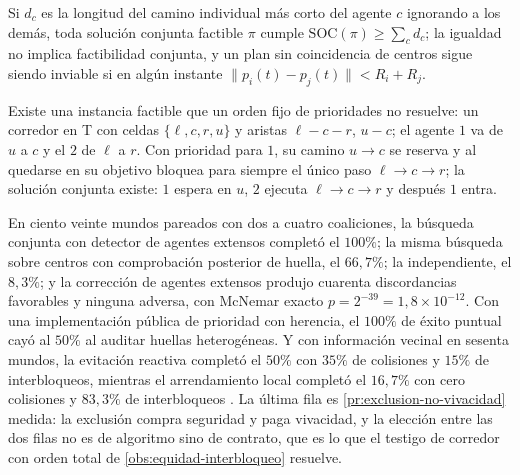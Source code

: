 \begin{lema}
\label{le:caminos-independientes}
Si $d_c$ es la longitud del camino individual más corto del agente $c$
ignorando a los demás, toda solución conjunta factible $\pi$ cumple
$\mathrm{SOC}(\pi)\ge\sum_cd_c$; la igualdad no implica factibilidad
conjunta, y un plan sin coincidencia de centros sigue siendo inviable si en
algún instante $\lVert p_i(t)-p_j(t)\rVert<R_i+R_j$.
\end{lema}

\begin{proposicion}
\label{pr:prioridad-incompleta}
Existe una instancia factible que un orden fijo de prioridades no resuelve:
un corredor en T con celdas $\{\ell,c,r,u\}$ y aristas $\ell-c-r$, $u-c$; el
agente $1$ va de $u$ a $c$ y el $2$ de $\ell$ a $r$. Con prioridad para $1$,
su camino $u\to c$ se reserva y al quedarse en su objetivo bloquea para
siempre el único paso $\ell\to c\to r$; la solución conjunta existe: $1$
espera en $u$, $2$ ejecuta $\ell\to c\to r$ y después $1$ entra.
\end{proposicion}

\begin{observacion}
\label{obs:campanas-n123}
En ciento veinte mundos pareados con dos a cuatro coaliciones, la búsqueda
conjunta con detector de agentes extensos completó el $100\%$; la misma
búsqueda sobre centros con comprobación posterior de huella, el $66{,}7\%$;
la independiente, el $8{,}3\%$; y la corrección de agentes extensos produjo
cuarenta discordancias favorables y ninguna adversa, con McNemar exacto
$p=2^{-39}=1{,}8\times10^{-12}$. Con una implementación pública de
prioridad con herencia, el $100\%$ de éxito puntual cayó al $50\%$ al
auditar huellas heterogéneas. Y con información vecinal en sesenta mundos,
la evitación reactiva completó el $50\%$ con $35\%$ de colisiones y $15\%$ de
interbloqueos, mientras el arrendamiento local completó el $16{,}7\%$ con cero
colisiones y $83{,}3\%$ de interbloqueos \cite{mayorga2026compendio}. La
última fila es \cref{pr:exclusion-no-vivacidad} medida: la exclusión compra
seguridad y paga vivacidad, y la elección entre las dos filas no es de
algoritmo sino de contrato, que es lo que el testigo de corredor con orden
total de \cref{obs:equidad-interbloqueo} resuelve.
\end{observacion}
